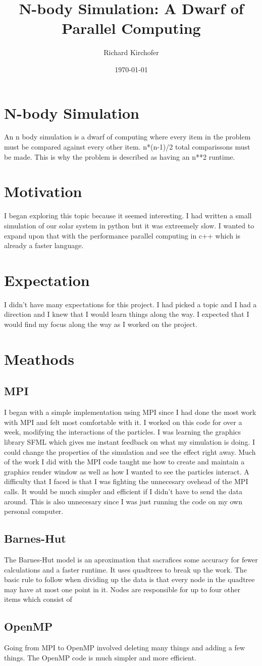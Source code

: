 \documentclass[12pt]{article}
\title{N-body Simulation: A Dwarf of Parallel Computing}
\author{Richard Kirchofer}
\date{\today}
\begin{document}
\maketitle
\section{N-body Simulation}
An n body simulation is a dwarf of computing where every item in the problem must be compared against every other item. n*(n-1)/2 total comparissons must be made. This is why the problem is described as having an n**2 runtime.
\section{Motivation}
I began exploring this topic because it seemed interesting. I had written a small simulation of our solar system in python but it was extreemely slow. I wanted to expand upon that with the performance parallel computing in c++ which is already a faster language.
\section{Expectation}
I didn't have many expectations for this project. I had picked a topic and I had a direction and I knew that I would learn things along the way. I expected that I would find my focus along the way as I worked on the project.
\section{Meathods}
\subsection{MPI}
I began with a simple implementation using MPI since I had done the most work with MPI and felt most comfortable with it. I worked on this code for over a week, modifying the interactions of the particles. I was learning the graphics library SFML which gives me instant feedback on what my simulation is doing. I could change the properties of the simulation and see the effect right away. Much of the work I did with the MPI code taught me how to create and maintain a graphics render window as well as how I wanted to see the particles interact. A difficulty that I faced is that I was fighting the unnecesary ovehead of the MPI calls. It would be much simpler and efficient if I didn't have to send the data around. This is also unnecesary since I was just running the code on my own personal computer.
\subsection{Barnes-Hut}
The Barnes-Hut model is an aproximation that sacrafices some accuracy for fewer calculations and a faster runtime. It uses quadtrees to break up the work. The basic rule to follow when dividing up the data is that every node in the quadtree may have at most one point in it. Nodes are responsible for up to four other items which consist of 
\subsection{OpenMP}
Going from MPI to OpenMP involved deleting many things and adding a few things. The OpenMP code is much simpler and more efficient.
\end{document}
